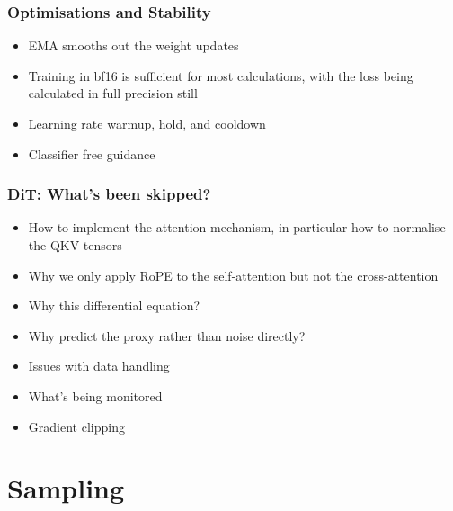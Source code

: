 \documentclass{beamer}
\begin{document}
\begin{frame}
    \frametitle{Optimisations and Stability}
    \begin{itemize}
        \setlength{\itemsep}{1em}
        \item EMA smooths out the weight updates
        \item Training in bf16 is sufficient for most calculations, with the loss being calculated in full precision still
        \item Learning rate warmup, hold, and cooldown
        \item Classifier free guidance
    \end{itemize}
\end{frame}

\begin{frame}
    \frametitle{DiT: What's been skipped?}
    \begin{itemize}
        \setlength{\itemsep}{1em}
        \item How to implement the attention mechanism, in particular how to normalise the QKV tensors
        \item Why we only apply RoPE to the self-attention but not the cross-attention
        \item Why this differential equation?
        \item Why predict the proxy rather than noise directly?
        \item Issues with data handling
        \item What's being monitored
        \item Gradient clipping
    \end{itemize}
\end{frame}

\section{Sampling}
\end{document}

